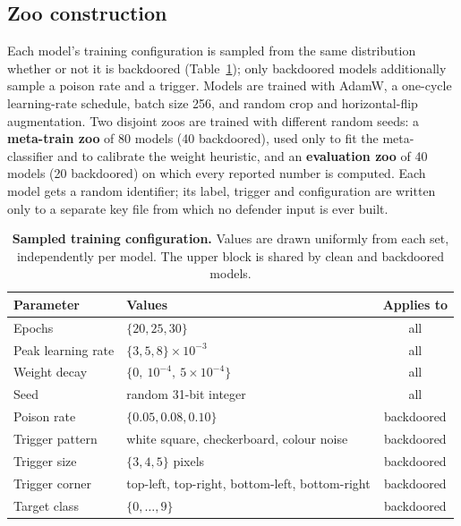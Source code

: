 \documentclass[11pt]{article}
\begin{document}
\subsection{Zoo construction}
Each model's training configuration is sampled from the same distribution whether or not it is
backdoored (Table~\ref{tab:hparams}); only backdoored models additionally sample a poison rate and a
trigger. Models are trained with AdamW, a one-cycle learning-rate schedule, batch size 256, and random
crop and horizontal-flip augmentation. Two disjoint zoos are trained with different random seeds: a
\textbf{meta-train zoo} of 80 models (40 backdoored), used only to fit the meta-classifier and to
calibrate the weight heuristic, and an \textbf{evaluation zoo} of 40 models (20 backdoored) on which
every reported number is computed. Each model gets a random identifier; its label, trigger and
configuration are written only to a separate key file from which no defender input is ever built.

\begin{table}[!htb]
  \centering
  \caption{\textbf{Sampled training configuration.} Values are drawn uniformly from each set,
  independently per model. The upper block is shared by clean and backdoored models.}
  \label{tab:hparams}
  \small
  \begin{tabular}{llc}
    \toprule
    Parameter & Values & Applies to \\
    \midrule
    Epochs & $\{20, 25, 30\}$ & all \\
    Peak learning rate & $\{3, 5, 8\} \times 10^{-3}$ & all \\
    Weight decay & $\{0,\ 10^{-4},\ 5 \times 10^{-4}\}$ & all \\
    Seed & random 31-bit integer & all \\
    \midrule
    Poison rate & $\{0.05, 0.08, 0.10\}$ & backdoored \\
    Trigger pattern & white square, checkerboard, colour noise & backdoored \\
    Trigger size & $\{3, 4, 5\}$ pixels & backdoored \\
    Trigger corner & top-left, top-right, bottom-left, bottom-right & backdoored \\
    Target class & $\{0, \dots, 9\}$ & backdoored \\
    \bottomrule
  \end{tabular}
\end{table}
\end{document}
